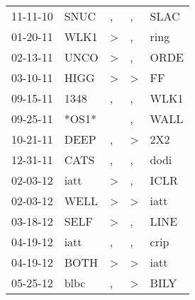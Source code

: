 \begin{supertabular}{p{0.07\textwidth}p{0.06\textwidth}p{0.02\textwidth}p{0.02\textwidth}p{0.06\textwidth}}
          11-11-10\textsuperscript{} &           SNUC\textsuperscript{} &                , &                , &           SLAC\textsuperscript{} \\
          01-20-11\textsuperscript{} &           WLK1\textsuperscript{} &     \textgreater &                , &           ring\textsuperscript{} \\
          02-13-11\textsuperscript{} &           UNCO\textsuperscript{} &     \textgreater &                , &           ORDE\textsuperscript{} \\
          03-10-11\textsuperscript{} &           HIGG\textsuperscript{} &     \textgreater &     \textgreater &             FF\textsuperscript{} \\
          09-15-11\textsuperscript{} &           1348\textsuperscript{} &                , &                , &           WLK1\textsuperscript{} \\
          09-25-11\textsuperscript{} &                            *OS1* &                  &                , &           WALL\textsuperscript{} \\
          10-21-11\textsuperscript{} &           DEEP\textsuperscript{} &                , &     \textgreater &            2X2\textsuperscript{} \\
          12-31-11\textsuperscript{} &           CATS\textsuperscript{} &                , &                , &           dodi\textsuperscript{} \\
          02-03-12\textsuperscript{} &           iatt\textsuperscript{} &     \textgreater &                , &           ICLR\textsuperscript{} \\
          02-03-12\textsuperscript{} &           WELL\textsuperscript{} &     \textgreater &     \textgreater &           iatt\textsuperscript{} \\
          03-18-12\textsuperscript{} &           SELF\textsuperscript{} &     \textgreater &                , &           LINE\textsuperscript{} \\
          04-19-12\textsuperscript{} &           iatt\textsuperscript{} &                , &                , &           crip\textsuperscript{} \\
          04-19-12\textsuperscript{} &           BOTH\textsuperscript{} &     \textgreater &     \textgreater &           iatt\textsuperscript{} \\
          05-25-12\textsuperscript{} &           blbc\textsuperscript{} &                , &     \textgreater &           BILY\textsuperscript{} \\

\end{supertabular}
